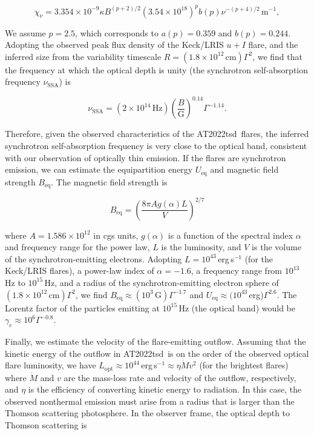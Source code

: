 \documentclass{nature_plusfigure}
\newcommand{\at}{AT2022tsd}
\begin{document}
\begin{methods}
\begin{equation}
\label{eq:synchrotron-tau}
\chi_\nu = 3.354\times10^{-9} \kappa B^{(p+2)/2} (3.54\times10^{18})^p b(p) \nu^{-(p+4)/2}\,\mathrm{m}^{-1},
\end{equation}

We assume $p=2.5$, which corresponds to\cite{Longair2011} $a(p)=0.359$ and $b(p)=0.244$. Adopting the observed peak flux density of the Keck/LRIS $u+I$ flare, and the inferred size from the variability timescale $R=(1.8\times10^{12}\,\mathrm{cm})\Gamma^2$, we find that the frequency at which the optical depth is unity (the synchrotron self-absorption frequency $\nu_\mathrm{SSA}$) is

\begin{equation}
\label{eq:ssa}
\nu_\mathrm{SSA} = (2\times10^{14}\,\mathrm{Hz}) \left(\frac{B}{\mathrm{G}} \right)^{0.14} \Gamma^{-1.14}.
\end{equation}

\noindent Therefore, given the observed characteristics of the \at\ flares, the inferred synchrotron self-absorption frequency is very close to the optical band, consistent with our observation of optically thin emission.
If the flares are synchrotron emission, we can  
estimate the equipartition energy $U_\mathrm{eq}$ and magnetic field strength $B_\mathrm{eq}$. The magnetic field strength is

\begin{equation}
B_\mathrm{eq} = \left( \frac{8\pi A g(\alpha) L}{V} \right)^{2/7}
\end{equation}

\noindent where $A=1.586\times10^{12}$ in cgs units, $g(\alpha)$ is a function of the spectral index $\alpha$ and frequency range for the power law, $L$ is the luminosity, and $V$ is the volume of the synchrotron-emitting electrons. Adopting $L=10^{43}\,$erg\,s$^{-1}$ (for the Keck/LRIS flares), a power-law index of $\alpha=-1.6$, a frequency range from $10^{13}$\,Hz to $10^{15}$\,Hz, and a radius of the synchrotron-emitting electron sphere of $(1.8\times10^{12}\,\mathrm{cm})\Gamma^2$, we find $B_\mathrm{eq}\approx(10^{3}\,\mathrm{G})\Gamma^{-1.7}$ and $U_\mathrm{eq}\approx(10^{43}\,$erg)$\Gamma^{2.6}$. The Lorentz factor of the particles emitting at $10^{15}$\,Hz (the optical band) would be $\gamma_e\approx10^{6} \Gamma^{-0.8}$.

Finally, we estimate the velocity of the flare-emitting outflow. Assuming that the kinetic energy of the outflow in \at\ is on the order of the observed optical flare luminosity, we have $L_\mathrm{opt} \approx 10^{44}\,$erg\,s$^{-1} \approx \eta \dot{M}v^2$ (for the brightest flares) where $\dot{M}$ and $v$ are the mass-loss rate and velocity of the outflow, respectively, and $\eta$ is the efficiency of converting kinetic energy to radiation. In this case, the observed nonthermal emission must arise from a radius that is larger than the Thomson scattering photosphere. In the observer frame, the optical depth to Thomson scattering is


\end{methods}
\end{document}
